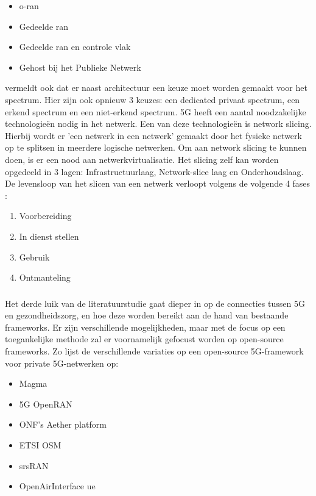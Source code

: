 \begin{itemize}
  \item \gls{o-ran}
  \item Gedeelde \gls{ran}
  \item Gedeelde \gls{ran} en controle vlak
  \item Gehost bij het Publieke Netwerk
\end{itemize}

\textcite{wen2021private} vermeldt ook dat er naast architectuur een keuze moet worden gemaakt voor het spectrum. Hier zijn ook opnieuw 3 keuzes: een dedicated privaat spectrum, een erkend spectrum en een niet-erkend spectrum. 
5G heeft een aantal noodzakelijke technologieën nodig in het netwerk. Een van deze technologieën is network slicing. Hierbij wordt er 'een netwerk in een netwerk' gemaakt door het fysieke netwerk op te splitsen in meerdere logische netwerken. Om aan network slicing te kunnen doen, is er een nood aan netwerkvirtualisatie. Het slicing zelf kan worden opgedeeld in 3 lagen: Infrastructuurlaag, Network-slice laag en Onderhoudslaag. De levensloop van het slicen van een netwerk verloopt volgens de volgende 4 fases \autocite{wen2021private}:

\begin{enumerate}
  \item Voorbereiding
  \item In dienst stellen
  \item Gebruik
  \item Ontmanteling
\end{enumerate}

\subsubsection{}

Het derde luik van de literatuurstudie gaat dieper in op de connecties tussen 5G en gezondheidszorg, en hoe deze worden bereikt aan de hand van bestaande frameworks. Er zijn verschillende mogelijkheden, maar met de focus op een toegankelijke methode zal er voornamelijk gefocust worden op open-source frameworks. Zo lijst \textcite{Eswaran2022} de verschillende variaties op een open-source 5G-framework voor private 5G-netwerken op:

\begin{itemize}
  \item Magma
  \item 5G OpenRAN
  \item ONF's Aether platform
  \item ETSI OSM
  \item \gls{srsRAN}
  \item OpenAirInterface \gls{ue}
\end{itemize}

